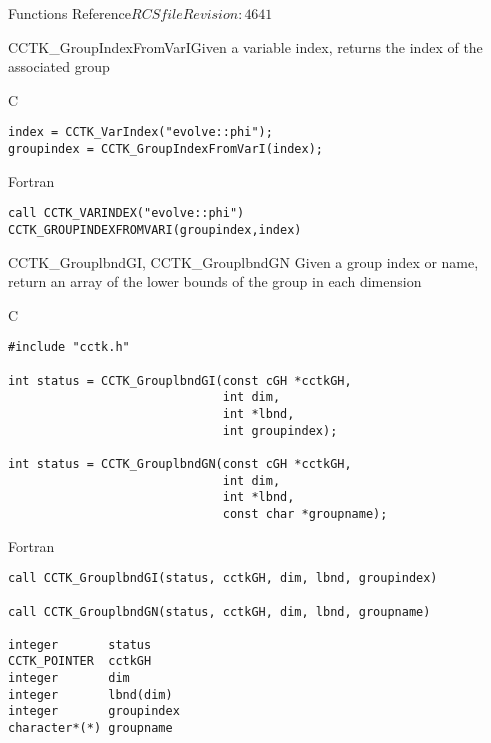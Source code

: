 \begin{cactuspart}{ Functions Reference}{$RCSfile$}{$Revision: 4641 $}
\begin{FunctionDescription}{CCTK\_GroupIndexFromVarI}{Given a variable index, returns the index of the associated group}
\begin{ExampleSection}
\begin{Example}{C}
\begin{verbatim}
index = CCTK_VarIndex("evolve::phi");
groupindex = CCTK_GroupIndexFromVarI(index);
\end{verbatim}
\end{Example}
\begin{Example}{Fortran}
\begin{verbatim}
call CCTK_VARINDEX("evolve::phi")
CCTK_GROUPINDEXFROMVARI(groupindex,index)
\end{verbatim}
\end{Example}
\end{ExampleSection}
\end{FunctionDescription}


\begin{FunctionDescription}{CCTK\_GrouplbndGI, CCTK\_GrouplbndGN}
\label{CCTK-GrouplbndGI}
\label{CCTK-GrouplbndGN}
Given a group index or name, return an array of the lower bounds of the group in each dimension

\begin{SynopsisSection}
\begin{Synopsis}{C}
\begin{verbatim}
#include "cctk.h"

int status = CCTK_GrouplbndGI(const cGH *cctkGH,
                              int dim,
                              int *lbnd,
                              int groupindex);

int status = CCTK_GrouplbndGN(const cGH *cctkGH,
                              int dim,
                              int *lbnd,
                              const char *groupname);
\end{verbatim}
\end{Synopsis}
\begin{Synopsis}{Fortran}
\begin{verbatim}
call CCTK_GrouplbndGI(status, cctkGH, dim, lbnd, groupindex)

call CCTK_GrouplbndGN(status, cctkGH, dim, lbnd, groupname)

integer       status
CCTK_POINTER  cctkGH
integer       dim
integer       lbnd(dim)
integer       groupindex
character*(*) groupname
\end{verbatim}
\end{Synopsis}
\end{SynopsisSection}


\end{FunctionDescription}
\end{cactuspart}
